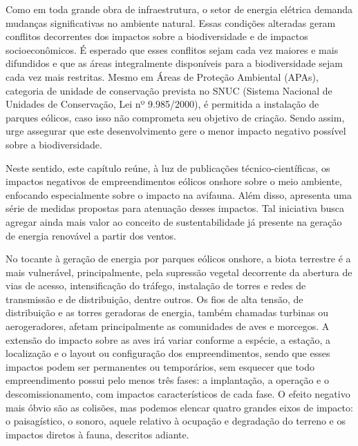 \documentclass[
]{scrbook}
\begin{document}
Como em toda grande obra de infraestrutura, o setor de energia elétrica demanda mudanças significativas no ambiente natural. Essas condições alteradas geram conflitos decorrentes dos impactos sobre a biodiversidade e de impactos socioeconômicos. É esperado que esses conflitos sejam cada vez maiores e mais difundidos e que as áreas integralmente disponíveis para a biodiversidade sejam cada vez mais restritas. Mesmo em Áreas de Proteção Ambiental (APAs), categoria de unidade de conservação prevista no SNUC (Sistema Nacional de Unidades de Conservação, Lei nº 9.985/2000), é permitida a instalação de parques eólicos, caso isso não comprometa seu objetivo de criação. Sendo assim, urge assegurar que este desenvolvimento gere o menor impacto negativo possível sobre a biodiversidade.

Neste sentido, este capítulo reúne, à luz de publicações técnico-científicas, os impactos negativos de empreendimentos eólicos onshore sobre o meio ambiente, enfocando especialmente sobre o impacto na avifauna. Além disso, apresenta uma série de medidas propostas para atenuação desses impactos. Tal iniciativa busca agregar ainda mais valor ao conceito de sustentabilidade já presente na geração de energia renovável a partir dos ventos.

No tocante à geração de energia por parques eólicos onshore, a biota terrestre é a mais vulnerável, principalmente, pela supressão vegetal decorrente da abertura de vias de acesso, intensificação do tráfego, instalação de torres e redes de transmissão e de distribuição, dentre outros. Os fios de alta tensão, de distribuição e as torres geradoras de energia, também chamadas turbinas ou aerogeradores, afetam principalmente as comunidades de aves e morcegos. A extensão do impacto sobre as aves irá variar conforme a espécie, a estação, a localização e o layout ou configuração dos empreendimentos, sendo que esses impactos podem ser permanentes ou temporários, sem esquecer que todo empreendimento possui pelo menos três fases: a implantação, a operação e o descomissionamento, com impactos característicos de cada fase. O efeito negativo mais óbvio são as colisões, mas podemos elencar quatro grandes eixos de impacto: o paisagístico, o sonoro, aquele relativo à ocupação e degradação do terreno e os impactos diretos à fauna, descritos adiante.
\end{document}
